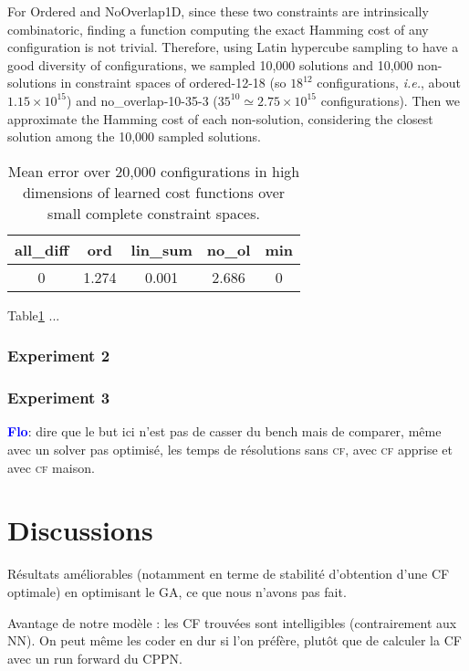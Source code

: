 \documentclass{article}
\newcommand{\ie}{\textit{i.e.}}
\newcommand{\cf}{\textsc{cf}\xspace}
\newcommand{\flo}{\textcolor{blue}{\bf Flo}\xspace}
\begin{document}
For  Ordered   and  NoOverlap1D,  since  these   two  constraints  are
intrinsically  combinatoric, finding  a function  computing the  exact
Hamming cost  of any configuration  is not trivial.   Therefore, using
Latin hypercube sampling  to have a good  diversity of configurations,
we  sampled 10,000  solutions and  10,000 non-solutions  in constraint
spaces  of  ordered-12-18  (so $18^{12}$  configurations,  \ie,  about
$1.15\times         10^{15}$)          and         no\_overlap-10-35-3
($35^{10}  \simeq   2.75\times  10^{15}$  configurations).    Then  we
approximate  the Hamming  cost of  each non-solution,  considering the
closest solution among the 10,000 sampled solutions.

\begin{table}
  \centering
\begin{tabular}{|c|c|c|c|c|}
  \hline
  all\_diff & ord & lin\_sum & no\_ol & min\\
  \hline
  0 & 1.274 & 0.001 & 2.686 & 0\\
  \hline
\end{tabular}
\caption{Mean error  over 20,000 configurations in  high dimensions of
  learned cost functions over small complete constraint spaces.}
\label{tab:cf_scale}
\end{table}

Table\ref{tab:cf_scale} ...

\subsubsection{Experiment 2}

\subsubsection{Experiment 3}
\flo:  dire que  le but  ici  n'est pas  de  casser du  bench mais  de
comparer, même avec un solver  pas optimisé, les temps de résolutions
sans \cf, avec \cf apprise et avec \cf maison.

\section{Discussions}

Résultats améliorables  (notamment en  terme de  stabilité d'obtention
d'une CF optimale) en optimisant le GA, ce que nous n'avons pas fait.

Avantage  de  notre  modèle  :  les  CF  trouvées  sont  intelligibles
(contrairement aux NN). On peut même les coder en dur si l'on préfère,
plutôt que de calculer la CF avec un run forward du CPPN.
\end{document}
